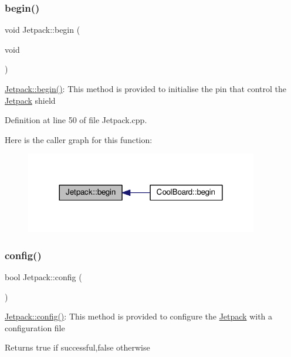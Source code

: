 \subsubsection{\texorpdfstring{begin()}{begin()}}
{\footnotesize\ttfamily void Jetpack\+::begin (\begin{DoxyParamCaption}\item[{void}]{ }\end{DoxyParamCaption})}

\hyperlink{class_jetpack_a5a53e1ebf7aaf3bf3e0d37ea64ca09a7}{Jetpack\+::begin()}\+: This method is provided to initialise the pin that control the \hyperlink{class_jetpack}{Jetpack} shield 

Definition at line 50 of file Jetpack.\+cpp.

Here is the caller graph for this function\+:\nopagebreak
\begin{figure}[H]
\begin{center}
\leavevmode
\includegraphics[width=288pt]{class_jetpack_a5a53e1ebf7aaf3bf3e0d37ea64ca09a7_icgraph}
\end{center}
\end{figure}
\mbox{\label{class_jetpack_ab065ee83e244265a2223a22f3ee4a719}} 
\subsubsection{\texorpdfstring{config()}{config()}}
{\footnotesize\ttfamily bool Jetpack\+::config (\begin{DoxyParamCaption}{ }\end{DoxyParamCaption})}

\hyperlink{class_jetpack_ab065ee83e244265a2223a22f3ee4a719}{Jetpack\+::config()}\+: This method is provided to configure the \hyperlink{class_jetpack}{Jetpack} with a configuration file

\begin{DoxyReturn}{Returns}
true if successful,false otherwise 
\end{DoxyReturn}


